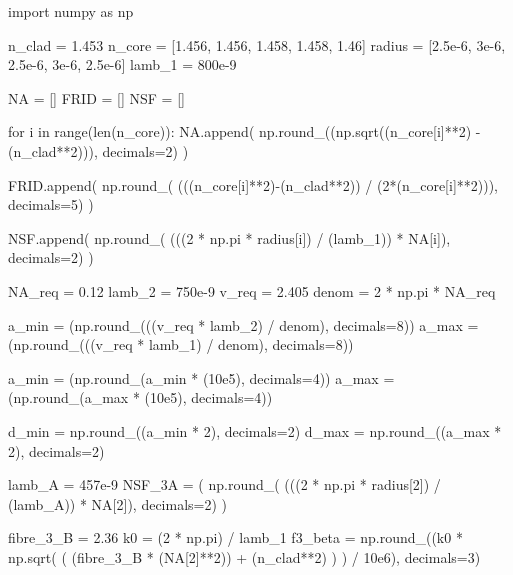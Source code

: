 \documentclass[colorlinks,11pt,a4paper,normalphoto,withhyper,ragged2e]{altareport}
\begin{document}
\newpage


\begin{pycode}
import numpy as np

n_clad = 1.453
n_core = [1.456, 1.456, 1.458, 1.458, 1.46]
radius = [2.5e-6, 3e-6, 2.5e-6, 3e-6, 2.5e-6]
lamb_1 = 800e-9

NA = []
FRID = []
NSF = []
    
for i in range(len(n_core)):
	NA.append( np.round_((np.sqrt((n_core[i]**2) - (n_clad**2))), decimals=2) )
	
	FRID.append( np.round_( (((n_core[i]**2)-(n_clad**2)) / (2*(n_core[i]**2))), decimals=5) )
	
	NSF.append( np.round_( (((2 * np.pi * radius[i]) / (lamb_1)) * NA[i]), decimals=2) )


NA_req = 0.12
lamb_2 = 750e-9
v_req = 2.405
denom = 2 * np.pi * NA_req

a_min = (np.round_(((v_req * lamb_2) / denom), decimals=8))
a_max = (np.round_(((v_req * lamb_1) / denom), decimals=8))

a_min = (np.round_(a_min * (10e5), decimals=4))
a_max = (np.round_(a_max * (10e5), decimals=4))

d_min = np.round_((a_min * 2), decimals=2)
d_max = np.round_((a_max * 2), decimals=2)


lamb_A = 457e-9
NSF_3A = ( np.round_( (((2 * np.pi * radius[2]) / (lamb_A)) * NA[2]), decimals=2) )


fibre_3_B = 2.36
k0 = (2 * np.pi) / lamb_1
f3_beta = np.round_((k0 * np.sqrt( ( (fibre_3_B * (NA[2]**2)) + (n_clad**2) ) )  / 10e6), decimals=3)
\end{pycode}
\end{document}
